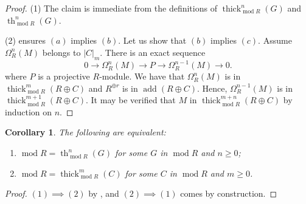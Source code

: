 \documentclass[11pt]{amsart}
\theoremstyle{plain}
\newtheorem{corollary}[theorem]{Corollary}
\theoremstyle{definition}
\numberwithin{equation}{section}
\numberwithin{theorem}{section}
\begin{document}
\begin{proof}
    (1) The claim is immediate from the definitions of $\operatorname{thick}_{\operatorname{mod}R}^n (G)$ and $\operatorname{th}_{\operatorname{mod}R}^n (G)$.

    (2)  ensures $(a)$ implies $(b)$. Let us show that $(b)$ implies $(c)$. Assume $\Omega_R^n (M)$ belongs to $|C|_m$. There is an exact sequence 
    \begin{displaymath}
    0 \to \Omega_R^n (M) \to P \to \Omega_R^{n-1} (M) \to 0.
    \end{displaymath}
    where $P$ is a projective $R$-module. We have that $\Omega_R^n (M)$ is in $\operatorname{thick}_{\operatorname{mod}R}^m(R\oplus C)$ and $R^{\oplus r}$ is in $\operatorname{add}(R\oplus C)$. Hence, $\Omega_R^{n-1} (M)$ is in $\operatorname{thick}_{\operatorname{mod}R}^{m+1}(R\oplus C)$. It may be verified that $M$ in $ \operatorname{thick}_{\operatorname{mod}R}^{m+n}(R\oplus C)$ by induction on $n$.
\end{proof}

\begin{corollary}
    The following are equivalent:
    \begin{enumerate}
        \item $\operatorname{mod} R=\operatorname{th}_{\operatorname{mod}R}^n(G)$ for some $G$ in $ \operatorname{mod}R$ and $n\geq 0$;
        \item $\operatorname{mod} R=\operatorname{thick}_{\operatorname{mod}R}^m (C)$ for some $C$ in $ \operatorname{mod}R$ and $m\geq 0$.
    \end{enumerate}
\end{corollary}

\begin{proof}
    $(1)\implies (2)$ by , and $(2)\implies (1)$ comes by construction.
\end{proof}
\end{document}
